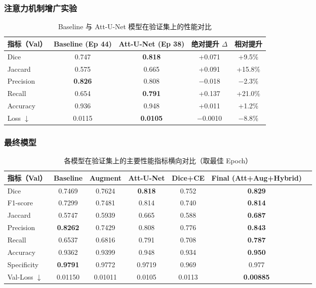 \subsubsection{注意力机制增广实验}

\begin{table}[htbp]
    \centering
    \caption{Baseline 与 Att-U-Net 模型在验证集上的性能对比}
    \label{tab:att_unet}
    \begin{tabular}{lcccc}
        \toprule
        指标（Val） & Baseline (Ep 44) & Att-U-Net (Ep 38) & 绝对提升 $\Delta$ & 相对提升 \\
        \midrule
        Dice        & 0.747 & \textbf{0.818} & +0.071 & +9.5\% \\
        Jaccard     & 0.575 & 0.665 & +0.091 & +15.8\% \\
        Precision   & \textbf{0.826} & 0.808 & $-$0.018 & $-$2.3\% \\
        Recall      & 0.654 & \textbf{0.791} & +0.137 & +21.0\% \\
        Accuracy    & 0.936 & 0.948 & +0.011 & +1.2\% \\
        Loss $\downarrow$ & 0.0115 & \textbf{0.0105} & $-$0.0010 & $-$8.8\% \\
        \bottomrule
    \end{tabular}
\end{table}

\subsubsection{最终模型}

\begin{table}[htbp]
    \centering
    \caption{各模型在验证集上的主要性能指标横向对比（取最佳 Epoch）}
    \label{tab:model_summary}
    \begin{tabular}{lcccccc}
        \toprule
        指标（Val） & Baseline & Augment & Att-U-Net & Dice+CE & Final (Att+Aug+Hybrid) \\
        \midrule
        Dice        & 0.7469 & 0.7624 & \textbf{0.818} & 0.752 & \textbf{0.829} \\
        F1-score    & 0.7299 & 0.7481 & 0.814 & 0.740 & \textbf{0.814} \\
        Jaccard     & 0.5747 & 0.5939 & 0.665 & 0.588 & \textbf{0.687} \\
        Precision   & \textbf{0.8262} & 0.7429 & 0.808 & 0.776 & \textbf{0.843} \\
        Recall      & 0.6537 & 0.6816 & 0.791 & 0.708 & \textbf{0.787} \\
        Accuracy    & 0.9362 & 0.9399 & 0.948 & 0.934 & \textbf{0.950} \\
        Specificity & \textbf{0.9791} & 0.9772 & 0.9719 & 0.969 & 0.977 \\
        Val-Loss $\downarrow$ & 0.01150 & 0.01011 & 0.0105 & 0.0113 & \textbf{0.00885} \\
        \bottomrule
    \end{tabular}
\end{table}

